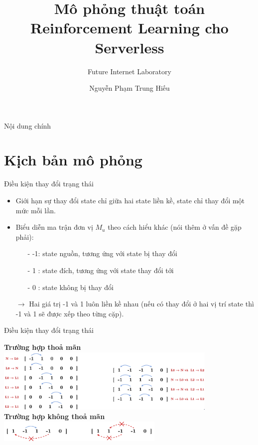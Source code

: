 \documentclass[10pt,aspectratio=169]{beamer}
\title{Mô phỏng thuật toán Reinforcement Learning cho Serverless}
\subtitle{Future Internet Laboratory}
\author{Nguyễn Phạm Trung Hiếu}
\begin{document}
\maketitle

\begingroup
    \begin{frame}{Nội dung chính}{}
        \tableofcontents
    \end{frame}
\endgroup

\section{Kịch bản mô phỏng}

\begin{frame}{Điều kiện thay đổi trạng thái}{\secname}
\begin{itemize}
\setlength\itemsep{8pt}
\item Giới hạn sự thay đổi state chỉ giữa hai state liền kề, state chỉ thay đổi một mức mỗi lần.
\item Biểu diễn ma trận đơn vị $ M_u $ theo cách hiểu khác (nói thêm ở vấn đề gặp phải):
\begin{itemize}
\setlength\itemsep{4pt}
\item[-] -1: state nguồn, tương ứng với state bị thay đổi
\item[-] 1 : state đích, tương ứng với state thay đổi tới
\item[-] 0 : state không bị thay đổi
\end{itemize}
\item[] $ \longrightarrow $ Hai giá trị -1 và 1 luôn liền kề nhau (nếu có thay đổi ở hai vị trí state thì -1 và 1 sẽ được xếp theo từng cặp).
\end{itemize}
\end{frame}

\begin{frame}{Điều kiện thay đổi trạng thái}{\secname}
\begin{center}
\textbf{\small Trường hợp thoả mãn}\\
\vspace{4pt}
\includegraphics[width=0.8\textwidth]{source/1.png}\\
\vspace{8pt}
\textbf{\small Trường hợp không thoả mãn}\\
\vspace{2pt}
\includegraphics[width=0.6\textwidth]{source/2.png}\\
\end{center}
\end{frame}
\end{document}
